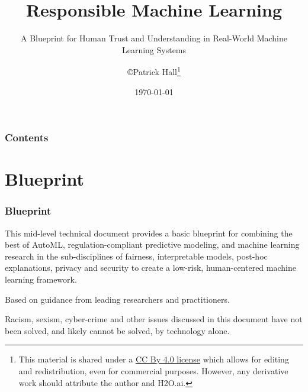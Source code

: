 \documentclass[11pt,
               aspectratio=169,
               hyperref={colorlinks}
               ]{beamer}
\author{\copyright\hspace{1pt}Patrick Hall\footnote{\tiny{This material is shared under a \href{https://creativecommons.org/licenses/by/4.0/deed.ast}{CC By 4.0 license} which allows for editing and redistribution, even for commercial purposes. However, any derivative work should attribute the author and H2O.ai.}}}
\title{Responsible Machine Learning}
\subtitle{\scriptsize{A Blueprint for Human Trust and Understanding in Real-World Machine Learning Systems}}
\institute{\href{https://www.h2o.ai}{H\textsubscript{2}O.ai}}
\date{\today}
\begin{document}
	
	\maketitle
	
	\begin{frame}
	
		\frametitle{Contents}
		
		\tableofcontents{}
		
	\end{frame}

	\section{Blueprint}
	
		\begin{frame}
		
			\frametitle{Blueprint}			
			
			This mid-level technical document provides a basic blueprint for combining the best of AutoML, regulation-compliant predictive modeling, and machine learning research in the sub-disciplines of fairness, interpretable models, post-hoc explanations, privacy and security to create a low-risk, human-centered machine learning framework.\\
			
			\vspace{10pt}			
			
			Based on guidance from leading researchers and practitioners.
			
			\vspace{10pt}
			
			Racism, sexism, cyber-crime and other issues discussed in this document have not been solved, and likely cannot be solved, by technology alone.  
			
		\end{frame}					
		
\end{document}
